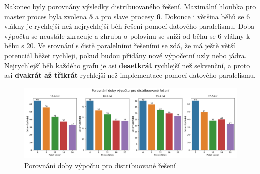 Nakonec byly porovnány výsledky distribuovaného řešení.
Maximální hloubka pro master proces byla zvolena \textbf{5} a pro slave procesy \textbf{6}.
Dokonce i většina běhů se 6 vlákny je rychlejší než nejrychlejší běh řešení pomocí datového paralelismu.
Doba výpočtu se neustále zkracuje a zhruba o polovinu se sníží od běhu se 6 vlákny k běhu s 20.
Ve srovnání s čistě paralelními řešeními se zdá, že má ještě větší potenciál běžet rychleji, pokud budou přidány nové výpočetní uzly nebo jádra.
Nejrychlejší běh každého grafu je asi \textbf{desetkrát} rychlejší než sekvenční, a proto asi \textbf{dvakrát až třikrát} rychlejší než implementace pomocí datového paralelismu.

\begin{figure}[!htbp]
\centerline{\includegraphics[scale=0.52]{report/images/distrib-graph.png}}
\caption{Porovnání doby výpočtu pro distribuované řešení}
\label{fig:distrib-graph.png}
\end{figure}
\FloatBarrier








